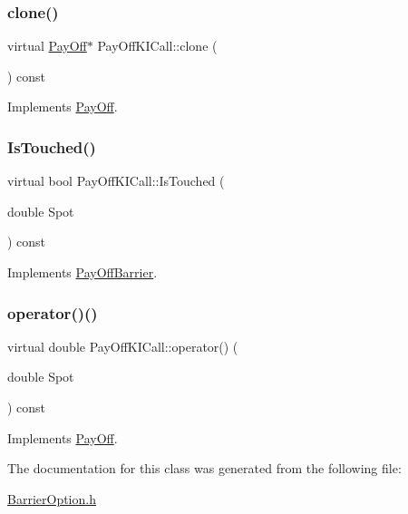 \subsubsection{\texorpdfstring{clone()}{clone()}}
{\footnotesize\ttfamily virtual \hyperlink{classPayOff}{Pay\+Off}$\ast$ Pay\+Off\+K\+I\+Call\+::clone (\begin{DoxyParamCaption}{ }\end{DoxyParamCaption}) const\hspace{0.3cm}{\ttfamily [virtual]}}



Implements \hyperlink{classPayOff_ad8194d5b82247ae89c25c515f0ba806a}{Pay\+Off}.

\hypertarget{classPayOffKICall_af16b41bce04b47515f543d2da2c449a9}{}\label{classPayOffKICall_af16b41bce04b47515f543d2da2c449a9} 
\subsubsection{\texorpdfstring{Is\+Touched()}{IsTouched()}}
{\footnotesize\ttfamily virtual bool Pay\+Off\+K\+I\+Call\+::\+Is\+Touched (\begin{DoxyParamCaption}\item[{double}]{Spot }\end{DoxyParamCaption}) const\hspace{0.3cm}{\ttfamily [virtual]}}



Implements \hyperlink{classPayOffBarrier_a2aa9162c618c4f72a6593dc625e1e1e8}{Pay\+Off\+Barrier}.

\hypertarget{classPayOffKICall_a4acdec35a77873ea44f529fad9a348d5}{}\label{classPayOffKICall_a4acdec35a77873ea44f529fad9a348d5} 
\subsubsection{\texorpdfstring{operator()()}{operator()()}}
{\footnotesize\ttfamily virtual double Pay\+Off\+K\+I\+Call\+::operator() (\begin{DoxyParamCaption}\item[{double}]{Spot }\end{DoxyParamCaption}) const\hspace{0.3cm}{\ttfamily [virtual]}}



Implements \hyperlink{classPayOff_a5ae17d82c233ef5568c8fb0539703000}{Pay\+Off}.



The documentation for this class was generated from the following file\+:\begin{DoxyCompactItemize}
\item 
\hyperlink{BarrierOption_8h}{Barrier\+Option.\+h}\end{DoxyCompactItemize}
